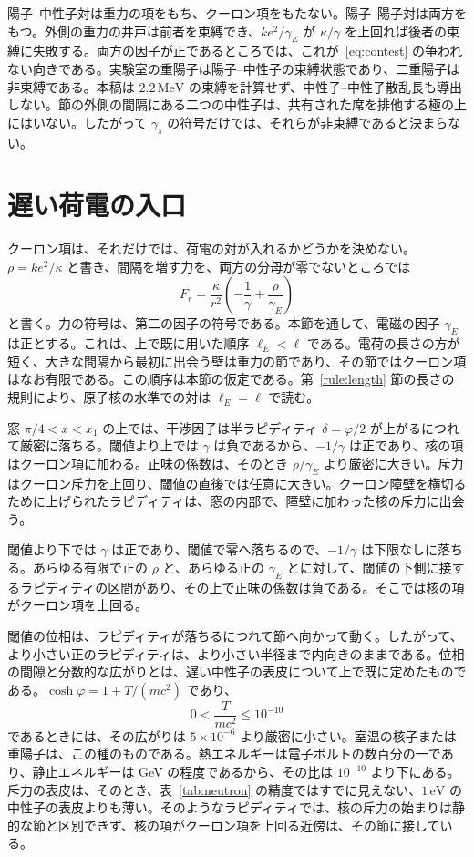 \documentclass[a4paper]{article}
\begin{document}
陽子--中性子対は重力の項をもち、クーロン項をもたない。陽子--陽子対は両方をもつ。外側の重力の井戸は前者を束縛でき、\(k e^{2}/\gamma_E\) が \(\kappa/\gamma\) を上回れば後者の束縛に失敗する。両方の因子が正であるところでは、これが~\eqref{eq:contest} の争われない向きである。実験室の重陽子は陽子--中性子の束縛状態であり、二重陽子は非束縛である。本稿は \(2.2\,\mathrm{MeV}\) の束縛を計算せず、中性子--中性子散乱長も導出しない。節の外側の間隔にある二つの中性子は、共有された席を排他する極の上にはいない。したがって \(\gamma_s\) の符号だけでは、それらが非束縛であると決まらない。

\section{遅い荷電の入口}
\label{sec:cold}

クーロン項は、それだけでは、荷電の対が入れるかどうかを決めない。\(\rho=k e^{2}/\kappa\) と書き、間隔を増す力を、両方の分母が零でないところでは
\begin{equation}
\label{eq:charged-net}
F_r
  =\frac{\kappa}{r^{2}}
  \left(-\frac{1}{\gamma}+\frac{\rho}{\gamma_E}\right)
\end{equation}
と書く。力の符号は、第二の因子の符号である。本節を通して、電磁の因子 \(\gamma_E\) は正とする。これは、上で既に用いた順序 \(\ell_E<\ell\) である。電荷の長さの方が短く、大きな間隔から最初に出会う壁は重力の節であり、その節ではクーロン項はなお有限である。この順序は本節の仮定である。第~\ref{rule:length} 節の長さの規則により、原子核の水準での対は \(\ell_E=\ell\) で読む。

窓 \(\pi/4<x<x_1\) の上では、干渉因子は半ラピディティ \(\delta=\varphi/2\) が上がるにつれて厳密に落ちる。閾値より上では \(\gamma\) は負であるから、\(-1/\gamma\) は正であり、核の項はクーロン項に加わる。正味の係数は、そのとき \(\rho/\gamma_E\) より厳密に大きい。斥力はクーロン斥力を上回り、閾値の直後では任意に大きい。クーロン障壁を横切るために上げられたラピディティは、窓の内部で、障壁に加わった核の斥力に出会う。

閾値より下では \(\gamma\) は正であり、閾値で零へ落ちるので、\(-1/\gamma\) は下限なしに落ちる。あらゆる有限で正の \(\rho\) と、あらゆる正の \(\gamma_E\) とに対して、閾値の下側に接するラピディティの区間があり、その上で正味の係数は負である。そこでは核の項がクーロン項を上回る。

閾値の位相は、ラピディティが落ちるにつれて節へ向かって動く。したがって、より小さい正のラピディティは、より小さい半径まで内向きのままである。位相の間隙と分数的な広がりとは、遅い中性子の表皮について上で既に定めたものである。\(\cosh\varphi=1+T/(mc^{2})\) であり、
\[
0<\frac{T}{mc^{2}}\le 10^{-10}
\]
であるときには、その広がりは \(5\times 10^{-6}\) より厳密に小さい。室温の核子または重陽子は、この種のものである。熱エネルギーは電子ボルトの数百分の一であり、静止エネルギーは GeV の程度であるから、その比は \(10^{-10}\) より下にある。斥力の表皮は、そのとき、表~\ref{tab:neutron} の精度ではすでに見えない、\(1\,\mathrm{eV}\) の中性子の表皮よりも薄い。そのようなラピディティでは、核の斥力の始まりは静的な節と区別できず、核の項がクーロン項を上回る近傍は、その節に接している。
\end{document}
